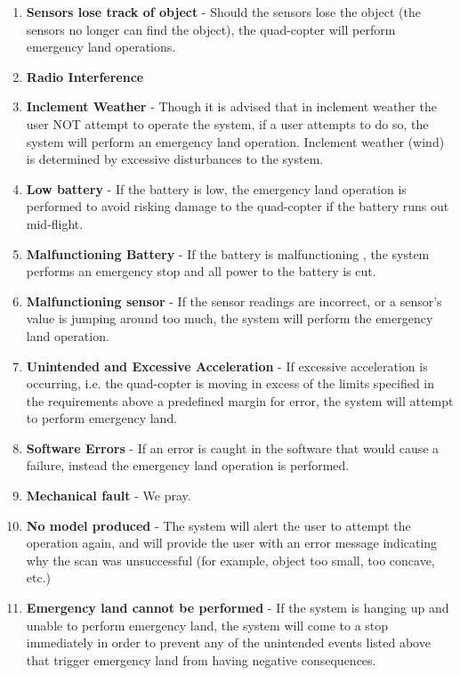 \documentclass[10pt,letterpaper]{article}
\begin{document}
\begin{enumerate}[label=\textbf{UB\arabic*}]
    
        \item \textbf{Sensors lose track of object} - Should the sensors lose the object (the sensors no longer can find the object), the quad-copter will perform emergency land operations.
        
        \item \textbf{Radio Interference}
        
        \item \textbf{Inclement Weather} - Though it is advised that in inclement weather the user NOT attempt to operate the system, if a user attempts to do so, the system will perform an emergency land operation. Inclement weather (wind) is determined by excessive disturbances to the system.
        
        \item \textbf{Low battery} - If the battery is low, the emergency land operation is performed to avoid risking damage to the quad-copter if the battery runs out mid-flight.
        
        \item \textbf{Malfunctioning Battery} - If the battery is malfunctioning , the system performs an emergency stop and all power to the battery is cut.
        
        \item \textbf{Malfunctioning sensor} - If the sensor readings are incorrect, or a sensor's value is jumping around too much, the system will perform the emergency land operation.
        
        \item \textbf{Unintended and Excessive Acceleration} - If excessive acceleration is occurring, i.e. the quad-copter is moving in excess of the limits specified in the requirements above a predefined margin for error, the system will attempt to perform emergency land.
        
        \item \textbf{Software Errors} - If an error is caught in the software that would cause a failure, instead the emergency land operation is performed.
        
        \item \textbf{Mechanical fault} - We pray.
        
        \item \textbf{No model produced} - The system will alert the user to attempt the operation again, and will provide the user with an error message indicating why the scan was unsuccessful (for example, object too small, too concave, etc.)
        
        \item \textbf{Emergency land cannot be performed} - If the system is hanging up and unable to perform emergency land, the system will come to a stop immediately in order to prevent any of the unintended events listed above that trigger emergency land from having negative consequences.
        
    \end{enumerate}
\end{document}
